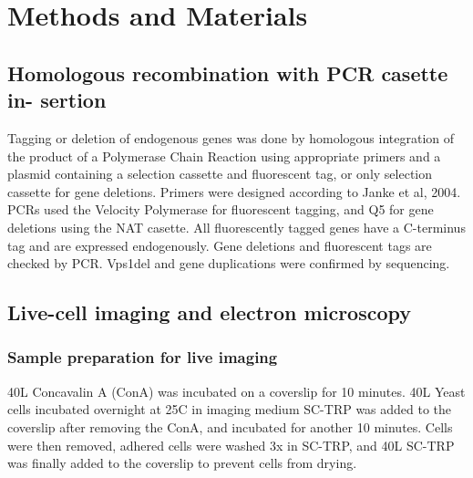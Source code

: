 \documentclass[9pt,lineno]{elife}
\begin{document}


\lipsum[9]

\section{Methods and Materials}

\subsection{Homologous recombination with PCR casette in- sertion}
Tagging or deletion of endogenous genes was done by homologous integration of the product of a Polymerase Chain Reaction using appropriate primers and a plasmid containing a selection cassette and fluorescent tag, or only selection cassette for gene deletions. Primers were designed according to Janke et al, 2004. PCRs used the Velocity Polymerase for fluorescent tagging, and Q5 for gene deletions using the NAT casette. All fluorescently tagged genes have a C-terminus tag and are expressed endogenously. Gene deletions and fluorescent tags are checked by PCR. Vps1del and gene duplications were confirmed by sequencing.


\subsection{Live-cell imaging and electron microscopy}
\subsubsection{Sample preparation for live imaging}
40{\textmu}L Concavalin A (ConA) was incubated on a coverslip for 10 minutes. 40{\textmu}L Yeast cells incubated overnight at 25C in imaging medium SC-TRP was added to the coverslip after removing the ConA, and incubated for another 10 minutes. Cells were then removed, adhered cells were washed 3x in SC-TRP, and 40{\textmu}L SC-TRP was finally added to the coverslip to prevent cells from drying.
\end{document}
